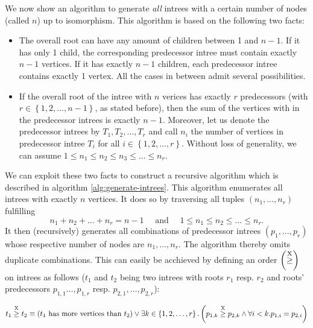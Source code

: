We now show an algorithm to generate \emph{all} intrees with a certain number of nodes (called $n$) up to isomorphism. This algorithm is based on the following two facts: 

\begin{itemize}
  \item The overall root can have any amount of children between 1 and $n-1$. If it has only 1 child, the corresponding predecessor intree must contain exactly $n-1$ vertices. If it has exactly $n-1$ children, each predecessor intree contains exactly 1 vertex. All the cases in between admit several possibilities.
  \item If the overall root of the intree with $n$ verices has exactly $r$ predecessors (with $r \in \left\{ 1,2,\dots,n-1 \right\}$, as stated before), then the sum of the vertices with in the predecessor intrees is exactly $n-1$. Moreover, let us denote the predecessor intrees by $T_1,T_2,\dots,T_r$ and call $n_i$ the number of vertices in predecessor intree $T_i$ for all $i\in\left\{1,2,\dots,r \right\}$. Without loss of generality, we can assume $1 \leq n_1 \leq n_2 \leq n_3 \leq \dots \leq n_r$.
\end{itemize}

We can exploit these two facts to construct a recursive algorithm which is described in algorithm \ref{alg:generate-intrees}. This algorithm enumerates all intrees with exactly $n$ vertices. It does so by traversing all tuples $(n_1,\dots,n_r)$ fulfilling
\begin{equation*}
  n_1 + n_2 + \dots + n_r = n-1 \quad \text{ and } \quad 1\leq n_1\leq n_2\leq\dots\leq n_r.
\end{equation*}
It then (recursively) generates all combinations of predecessor intrees $(p_1,\dots,p_r)$ whose respective number of nodes are $n_1,\dots,n_r$. The algorithm thereby omits duplicate combinations. This can easily be acchieved by defining an order $\left(\stackrel{\text{X}}{\geq}\right)$ on intrees as follows ($t_1$ and $t_2$ being two intrees with roots $r_1$ resp. $r_2$ and roots' predecessors $p_{1,1}\dots,p_{1,r}$ resp. $p_{2,1},\dots,p_{2,r}$):

\begin{equation}
  \label{eq:definition-treegeq}
  t_1 \stackrel{\text{X}}{\geq} t_2 \equiv (\text{$t_1$ has more vertices than $t_2$}) \vee \exists k \in \left\{ 1,2,\dots,r \right\}. \left( p_{1,k} \stackrel{\text{X}}{\geq} p_{2,k} \wedge \forall i<k. p_{1,i}=p_{2,i} \right)
\end{equation}

